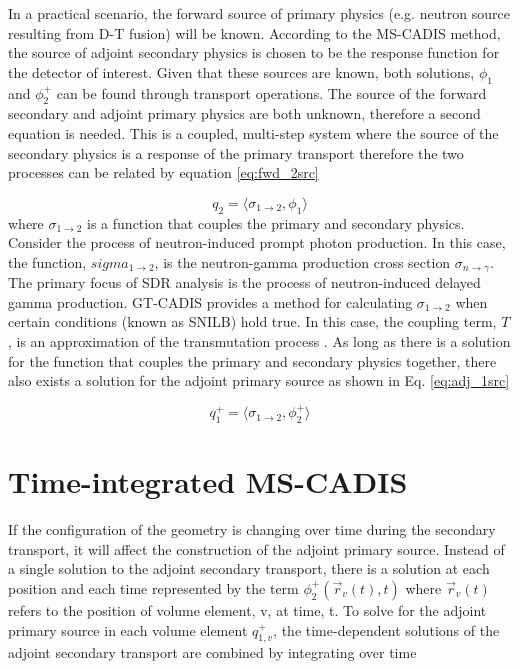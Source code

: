 In a practical scenario, the forward source of primary physics (e.g. neutron
source resulting from D-T fusion) will be known.  According to the MS-CADIS
method, the source of adjoint
secondary physics is chosen to be the response function for the
detector of interest.
Given that these sources are known, both solutions, $ \phi_{1} $ and
$\phi_{2}^{+} $ can be found through transport operations.
The source of the forward secondary and adjoint primary physics are both
unknown, therefore a second equation is needed.  This is a coupled, multi-step
system where the source of the secondary physics is
a response of the primary transport therefore the two processes can be related
by equation \ref{eq:fwd_2src}

 \begin{equation}\label{eq:fwd_2src}
	 q_{2} =
	 \langle \sigma_{1\rightarrow2}, \phi_{1} \rangle
 \end{equation}
where $\sigma_{1\rightarrow2}$ is a function that couples the primary
and secondary physics.
Consider the process of neutron-induced prompt photon production.
In this case, the function, $sigma_{1\rightarrow2}$, is the neutron-gamma production
cross section $\sigma_{n\rightarrow\gamma}$.  The primary focus of SDR analysis
is the process of neutron-induced delayed gamma production. 
GT-CADIS provides a method for calculating $\sigma_{1\rightarrow2}$ when
certain conditions (known as SNILB) hold true. In this case, the
coupling term, $T$, is an approximation of the transmutation
process \cite{gtcadis}.  As long as there is a solution for the
function that couples the primary and secondary physics together,
there also exists a solution for the adjoint primary source as shown in Eq.
\ref{eq:adj_1src}

 \begin{equation}\label{eq:adj_1src}
	 q_{1}^{+} = 
	 \langle \sigma_{1\rightarrow2}, \phi_{2}^{+} \rangle
 \end{equation}


\section{Time-integrated MS-CADIS}
If the configuration of the geometry is changing over time during
the secondary transport, it will affect the construction of the adjoint primary
source.  Instead of a single solution to the adjoint secondary transport, there
is a solution at each position and each time represented by the term
	$ \phi_{2}^{+}(\overrightarrow{r}_{v}(t), t)$
where $\overrightarrow{r}_{v}(t)$ refers to the position of volume element, v,
at time, t. 
To solve for the adjoint primary source in each volume element
$q_{1,v}^{+}$, the time-dependent solutions of the 
adjoint secondary transport are combined by integrating over time


